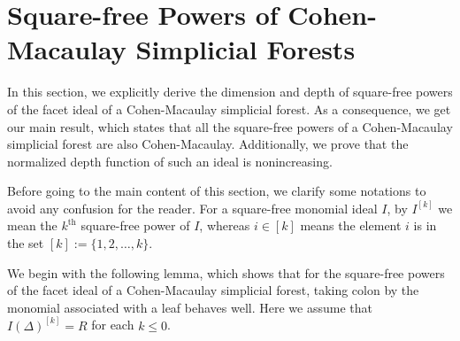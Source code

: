 \documentclass[12pt,a4paper,reqno]{amsart}
\theoremstyle{definition}
\def\D{\Delta}
\begin{document}
\section{Square-free Powers of Cohen-Macaulay Simplicial Forests}\label{Section 3}

In this section, we explicitly derive the dimension and depth of square-free powers of the facet ideal of a Cohen-Macaulay simplicial forest. As a consequence, we get our main result, which states that all the square-free powers of a Cohen-Macaulay simplicial forest are also Cohen-Macaulay. Additionally, we prove that the normalized depth function of such an ideal is nonincreasing. 



Before going to the main content of this section, we clarify some notations to avoid any confusion for the reader. For a square-free monomial ideal $I$, by $I^{[k]}$ we mean the $k^{\text{th}}$ square-free power of $I$, whereas $i\in[k]$ means the element $i$ is in the set $[k]:=\{1,2,\ldots,k\}$. 


We begin with the following lemma, which shows that for the square-free powers of the facet ideal of a Cohen-Macaulay simplicial forest, taking colon by the monomial associated with a leaf behaves well. Here we assume that $I(\D)^{[k]}=R$ for each $k\le 0$.
\end{document}
